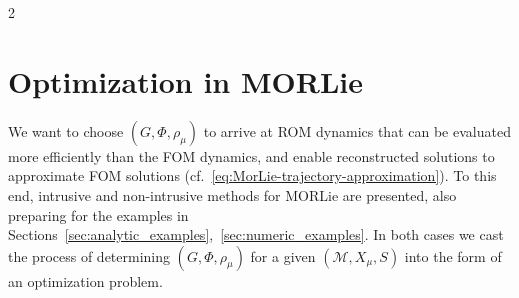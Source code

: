 \documentclass{article}
\newtheorem{proof}{Proof}[theorem]
\newtheorem{proposition}[theorem]{Proposition}
\newcommand{\M}{\mathcal{M}}                                %
\newcommand{\R}{\mathbb{R}}                                 %
\newcommand{\state}{x}
\begin{document}
\begin{multicols}{2}

\section{Optimization in MORLie}\label{sec:optimization}\label{ssec:MORLie_constructive}
We want to choose $(G,\Phi,\rho_\mu)$ to arrive at ROM dynamics that can be evaluated more efficiently than the FOM dynamics, and enable reconstructed solutions to approximate FOM solutions (cf.~\eqref{eq:MorLie-trajectory-approximation}).
To this end, intrusive and non-intrusive methods for MORLie are presented, also preparing for the examples in Sections~\ref{sec:analytic_examples},~\ref{sec:numeric_examples}. In both cases we cast the process of determining $(G,\Phi,\rho_\mu)$ for a given $(\M,X_\mu,S)$ into the form of an optimization problem. %


\end{multicols}
\end{document}
